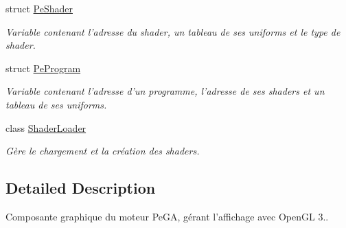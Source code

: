 \begin{DoxyCompactItemize}
struct \hyperlink{structPeGL_1_1PeShader}{Pe\-Shader}
\begin{DoxyCompactList}\small\item\em Variable contenant l'adresse du shader, un tableau de ses uniforms et le type de shader. \end{DoxyCompactList}\item 
struct \hyperlink{structPeGL_1_1PeProgram}{Pe\-Program}
\begin{DoxyCompactList}\small\item\em Variable contenant l'adresse d'un programme, l'adresse de ses shaders et un tableau de ses uniforms. \end{DoxyCompactList}\item 
class \hyperlink{classPeGL_1_1ShaderLoader}{Shader\-Loader}
\begin{DoxyCompactList}\small\item\em Gère le chargement et la création des shaders. \end{DoxyCompactList}\end{DoxyCompactItemize}


\subsection{Detailed Description}
Composante graphique du moteur Pe\-G\-A, gérant l'affichage avec Open\-G\-L 3.. 